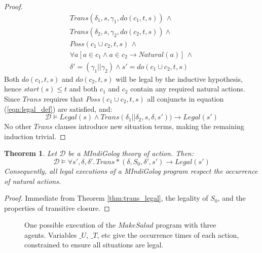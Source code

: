\documentclass[letterpaper]{article}
\newtheorem{theorem}{Theorem}
\begin{document}
\begin{proof}
\begin{multline*}
Trans(\delta_{1},s,\gamma_{1},do(c_{1},t,s))\,\wedge\\
Trans(\delta_{2},s,\gamma_{2},do(c_{2},t,s))\wedge\\
Poss(c_{1}\cup c_{2},t,s)\,\wedge\\
\forall a\left[a\in c_{1}\wedge a\in c_{2}\rightarrow Natural(a)\right]\,\wedge\\
\delta'=(\gamma_{1}||\gamma_{2})\wedge s'=do(c_{1}\cup c_{2},t,s)
\end{multline*}
Both $do(c_1,t,s)$ and $do(c_2,t,s)$ will be legal by the inductive hypothesis,
hence $start(s) \leq t$ and both $c_1$ and $c_2$ contain any required natural
actions.
Since $Trans$ requires that $Poss(c_1 \cup c_2,t,s)$ all conjuncts in
equation (\ref{eqn:legal_def}) are satisfied, and:
\begin{equation*}
\mathcal{D} \models Legal(s) \wedge Trans(\delta_1 || \delta_2,s,\delta,s'))
\rightarrow Legal(s')
\end{equation*}
No other $Trans$ clauses introduce new situation terms, making
the remaining induction trivial.
\end{proof}

\begin{theorem}
Let $\mathcal{D}$ be a MIndiGolog theory of action. Then:
\begin{equation*}
\mathcal{D} \models \forall s',\delta,\delta'.\,Trans*(\delta,S_0,\delta',s')
\rightarrow Legal(s')
\end{equation*}
Consequently, all legal executions of a MIndiGolog program respect
the occurrence of natural actions.
\end{theorem}

\begin{proof}
Immediate from Theorem \ref{thm:trans_legal}, the legality of $S_0$, and
the properties of transitive closure.
\end{proof}

\begin{figure*}[t]
\centering
{}
\caption{One possible execution of the $MakeSalad$
program with three agents. Variables $\_ U$, $\_ T$, etc give
the occurrence times of each action, constrained to ensure all situations
are legal.}\label{cap:example_trace}
\end{figure*}
\end{document}

